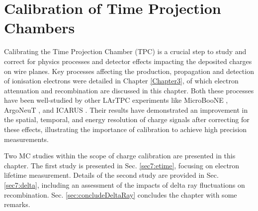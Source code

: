 
\chapter{Calibration of Time Projection Chambers}
\label{ChapterCalib}
\ifpdf
    \graphicspath{{Chapter8/Figs/Raster/}{Chapter8/Figs/PDF/}{Chapter8/Figs/}}
\else
    \graphicspath{{Chapter8/Figs/Vector/}{Chapter8/Figs/}}
\fi

Calibrating the Time Projection Chamber (TPC) is a crucial step to study and correct for physics processes and detector effects impacting the deposited charges on wire planes.
Key processes affecting the production, propagation and detection of ionisation electrons were detailed in Chapter \ref{Chapter3}, of which electron attenuation and recombination are discussed in this chapter.
Both these processes have been well-studied by other LArTPC experiments like MicroBooNE \cite{uboone_calib, ubooneEtime}, ArgoNeuT \cite{argoneut_recomb}, and ICARUS \cite{icarus_recomb, GrayDiffusion}.
Their results have demonstrated an improvement in the spatial, temporal, and energy resolution of charge signals after correcting for these effects, illustrating the importance of calibration to achieve high precision measurements.

Two MC studies within the scope of charge calibration are presented in this chapter.
The first study is presented in Sec. \ref{sec7:etime}, focusing on electron lifetime measurement.
Details of the second study are provided in Sec. \ref{sec7:delta}, including an assessment of the impacts of delta ray fluctuations on recombination.
Sec. \ref{sec:concludeDeltaRay} concludes the chapter with some remarks.


